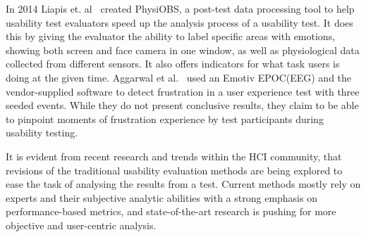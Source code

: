 In 2014 Liapis et. al~\cite{fusion4} created PhysiOBS, a post-test data processing tool to help usability test evaluators speed up the analysis process of a usability test. It does this by giving the evaluator the ability to label specific areas with emotions, showing both screen and face camera in one window, as well as physiological data collected from different sensors. It also offers indicators for what task users is doing at the given time.
Aggarwal et al.~\cite{sensor_example} used an Emotiv EPOC(EEG) and the vendor-supplied software to detect frustration in a
user experience test with three seeded events. While they do not present conclusive results, they claim to be able to
pinpoint moments of frustration experience by test participants during usability testing.

It is evident from recent research and trends within the HCI community, that revisions of the traditional usability
evaluation methods are being explored to ease the task of analysing the results from a test.
Current methods mostly rely on experts and their subjective analytic abilities with a strong emphasis on performance-based
metrics, and state-of-the-art research is pushing for more objective and user-centric analysis.